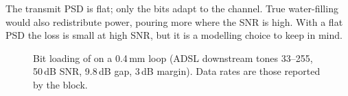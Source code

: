 \begin{pitfall}
The transmit PSD is flat; only the bits adapt to the channel. True water-filling would also
redistribute power, pouring more where the SNR is high. With a flat PSD the loss is small at
high SNR, but it is a modelling choice to keep in mind.
\end{pitfall}

\begin{figure}[htbp]
\centering
{}
\caption{Bit loading of  on a 0.4\,mm loop (ADSL downstream tones 33--255,
50\,dB SNR, 9.8\,dB gap, 3\,dB margin). Data rates are those reported by the block.}
\label{fig:dmt}
\end{figure}
